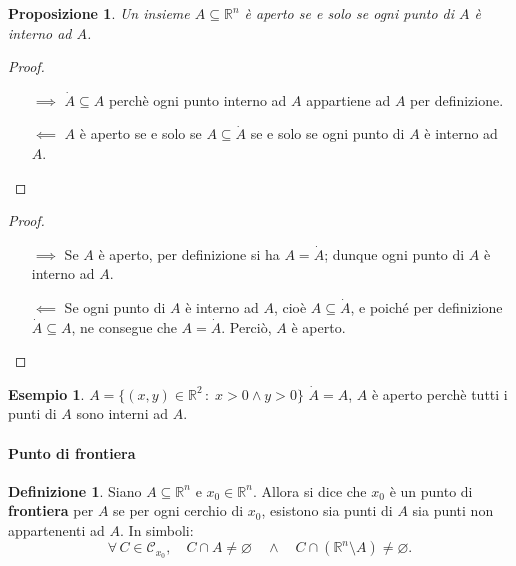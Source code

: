 \documentclass{article}
\theoremstyle{plain}
\newtheorem{prop}[thm]{Proposizione}
\theoremstyle{definition}
\newtheorem{defn}{Definizione}[section]
\newtheorem{exmp}{Esempio}[section]
\theoremstyle{remark}
\begin{document}
\vspace{10pt}

\begin{bxthm}
    \begin{prop}
    Un insieme $A\subseteq\mathbb{R}^n$ è aperto se e solo se ogni punto di $A$ è interno ad $A$.
    \end{prop}
\end{bxthm}
\begin{proof}\hfill
    \begin{itemize}
        \item[$\implies$] $\dot{A}\subseteq A$ perchè ogni punto interno ad $A$ appartiene ad $A$ per definizione. 
        \item[$\impliedby$] $A$ è aperto se e solo se $A\subseteq\dot{A}$ se e solo se ogni punto di $A$ è interno ad $A$.
    \end{itemize}
\end{proof}
\begin{proof}\hfill
\begin{itemize}
    \item[$\implies$] Se $A$ è aperto, per definizione si ha $A=\dot{A}$; dunque ogni punto di $A$ è interno ad $A$.
    \item[$\impliedby$] Se ogni punto di $A$ è interno ad $A$, cioè $A\subseteq\dot{A}$, e poiché per definizione $\dot{A}\subseteq A$, ne consegue che $A=\dot{A}$. Perciò, $A$ è aperto.
\end{itemize}
\end{proof}

\vspace{10pt}

\begin{exmp}
    $A=\{(x,y)\in\mathbb{R}^2\,:\; x>0\land y>0\}$
    $\dot{A}=A$, $A$ è aperto perchè tutti i punti di $A$ sono interni ad $A$.
\end{exmp}

\vspace{10pt}

\paragraph{Punto di frontiera}
\begin{bxthm}
\begin{defn}
    Siano $A\subseteq\mathbb{R}^n$ e $x_0\in\mathbb{R}^n$.
    Allora si dice che $x_0$ è un punto di \textbf{frontiera} per $A$ se per ogni cerchio di $x_0$, esistono sia punti di $A$ sia punti non appartenenti ad $A$.
    In simboli:
    \[
    \forall\, C\in\mathcal{C}_{x_0},\quad C\cap A\neq\varnothing \quad \land \quad C\cap (\mathbb{R}^n\setminus A)\neq\varnothing.
    \]
\end{defn}
\end{bxthm}
\end{document}
